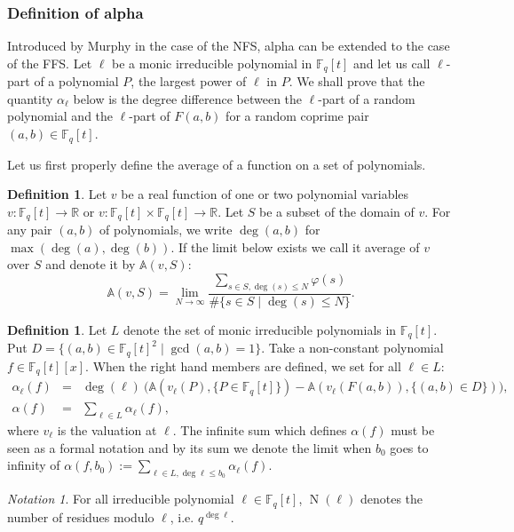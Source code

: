 \documentclass[a4wide]{article}
\newcommand{\F}{{\mathbb F}}
\newcommand{\A}{{\mathbb A}}
\DeclareMathOperator{\Norm}{N}
\theoremstyle{plain}
\theoremstyle{definition}
\newtheorem{deff}[theo]{Definition}
\theoremstyle{remark}
\newtheorem{nott}[theo]{Notation}
\begin{document}
\subsubsection{Definition of alpha}

Introduced by Murphy \cite{Mur99} in the case of the NFS, alpha can be
extended to the case of the FFS.  Let $\ell$ be a monic irreducible
polynomial in $\F_q[t]$ and let us call $\ell$-part of a polynomial $P$,
the largest power of $\ell$ in $P$.  We shall prove that the quantity
$\alpha_\ell$ below is the degree difference between the $\ell$-part of a
random polynomial and the $\ell$-part of $F(a,b)$ for a
random coprime pair $(a,b)\in\F_q[t]$.

Let us first properly define the average of a function on a set
of polynomials.

\begin{deff}
Let $v$ be a real function of one or two polynomial variables
$v:\F_q[t]\rightarrow \mathbb{R}$ or $v:\F_q[t]\times \F_q[t]\rightarrow
\mathbb{R}$. Let $S$ be a subset of the domain of $v$.
For any pair $(a,b)$ of polynomials, we write
$\deg(a,b)$ for $\max(\deg(a),\deg(b))$.
If the limit below exists we call it
average of $v$ over $S$ and denote
it by $\mathbb{A}(v,S)$:
\begin{equation*}
    \mathbb{A}(v,S) = 
\lim_{N\rightarrow\infty}\frac{\sum_{s\in S,\deg(s)\leq
N}\varphi(s)}{\#\{s\in S\mid \deg(s)\leq N\}}.  
\end{equation*} 
\end{deff}


\begin{deff}
	Let $L$ denote the set of monic irreducible polynomials in
	$\F_q[t]$. Put $D=\{(a,b)\in \F_q[t]^2\mid
\gcd(a,b)=1\}$. Take a non-constant polynomial $f\in \F_q[t][x]$. When the right hand
	members are defined, we set for all $\ell\in L$:
\begin{eqnarray*}
\alpha_\ell(f)&=&\deg(\ell)\ \Big(\A\left(v_\ell(P),\{P\in\F_q[t]\}\right)
    -\A\left(v_\ell(F(a,b)),\{(a,b)\in D\}\right)\Big),\\
	\alpha(f)&=&\sum_{\ell \in L}\alpha_\ell(f),
\end{eqnarray*} 
where $v_\ell$ is the valuation at $\ell$. The infinite sum which defines
$\alpha(f)$ must be seen as a formal notation and by its sum we denote the
limit when $b_0$ goes to infinity of $\alpha(f,b_0):=\sum_{\ell\in L,\deg
\ell\leq b_0}\alpha_\ell(f)$.
\end{deff}


\begin{nott}
	For all irreducible polynomial $\ell\in\F_q[t]$, $\Norm(\ell)$
denotes the number of residues modulo $\ell$, i.e. $q^{\deg \ell}$.
\end{nott}
\end{document}

